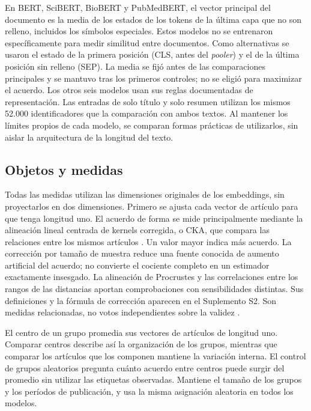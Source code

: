 \documentclass[12pt]{article}
\begin{document}
En BERT, SciBERT, BioBERT y PubMedBERT, el vector principal del documento es la media de los estados de los tokens de la última capa que no son relleno, incluidos los símbolos especiales. Estos modelos no se entrenaron específicamente para medir similitud entre documentos. Como alternativas se usaron el estado de la primera posición (CLS, antes del \emph{pooler}) y el de la última posición sin relleno (SEP). La media se fijó antes de las comparaciones principales y se mantuvo tras los primeros controles; no se eligió para maximizar el acuerdo. Los otros seis modelos usan sus reglas documentadas de representación. Las entradas de solo título y solo resumen utilizan los mismos 52.000 identificadores que la comparación con ambos textos. Al mantener los límites propios de cada modelo, se comparan formas prácticas de utilizarlos, sin aislar la arquitectura de la longitud del texto.


\subsection{Objetos y medidas}
Todas las medidas utilizan las dimensiones originales de los embeddings, sin proyectarlos en dos dimensiones. Primero se ajusta cada vector de artículo para que tenga longitud uno. El acuerdo de forma se mide principalmente mediante la alineación lineal centrada de kernels corregida, o CKA, que compara las relaciones entre los mismos artículos \citep{pmlr-v97-kornblith19a,refa961d84a4e}. Un valor mayor indica más acuerdo. La corrección por tamaño de muestra reduce una fuente conocida de aumento artificial del acuerdo; no convierte el cociente completo en un estimador exactamente insesgado. La alineación de Procrustes y las correlaciones entre los rangos de las distancias aportan comprobaciones con sensibilidades distintas. Sus definiciones y la fórmula de corrección aparecen en el Suplemento S2. Son medidas relacionadas, no votos independientes sobre la validez \citep{NEURIPS2021_252a3dba,pmlr-v285-williams24a}.

El centro de un grupo promedia sus vectores de artículos de longitud uno. Comparar centros describe así la organización de los grupos, mientras que comparar los artículos que los componen mantiene la variación interna. El control de grupos aleatorios pregunta cuánto acuerdo entre centros puede surgir del promedio sin utilizar las etiquetas observadas. Mantiene el tamaño de los grupos y los períodos de publicación, y usa la misma asignación aleatoria en todos los modelos.
\end{document}
